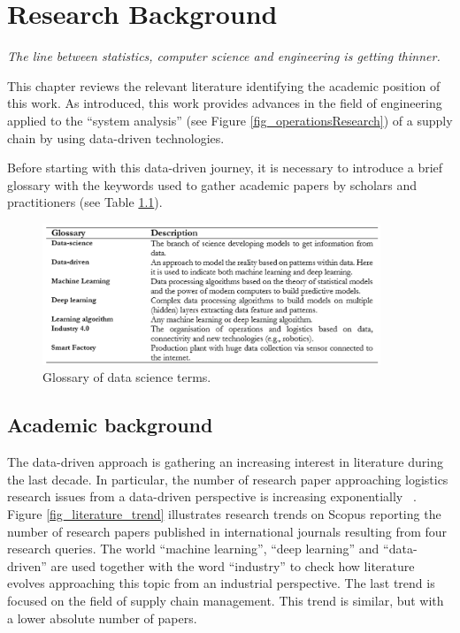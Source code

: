 \chapter{Research Background}

\epigraph{\textit{The line between statistics, computer science and engineering is getting thinner.}}{}


This chapter reviews the relevant literature identifying the academic position of this work. As introduced, this work provides advances in the field of engineering applied to the “system analysis” (see Figure \ref{fig_operationsResearch}) of a supply chain by using data-driven technologies.\par

Before starting with this data-driven journey, it is necessary to introduce a brief glossary with the keywords used to gather academic papers by scholars and practitioners (see Table \ref{tab_dataGlossary}).

\begin{figure}[hbt!]
\centering
\includegraphics[width=0.9\textwidth]{SectionIntroduction/researchBackground_figures/tab_dataGlossary.png}
\captionsetup{type=figure}
\caption{Glossary of data science terms.}
\label{tab_dataGlossary}
\end{figure}

\section{Academic background}

The data-driven approach is gathering an increasing interest in literature during the last decade. In particular, the number of research paper approaching logistics research issues from a data-driven perspective is increasing exponentially ~\cite{Moktadir2019, Spanaki2018}. Figure \ref{fig_literature_trend} illustrates research trends on Scopus reporting the number of research papers published in international journals resulting from four research queries. The world “machine learning”, “deep learning” and “data-driven” are used together with the word “industry” to check how literature evolves approaching this topic from an industrial perspective. The last trend is focused on the field of supply chain management. This trend is similar, but with a lower absolute number of papers.

